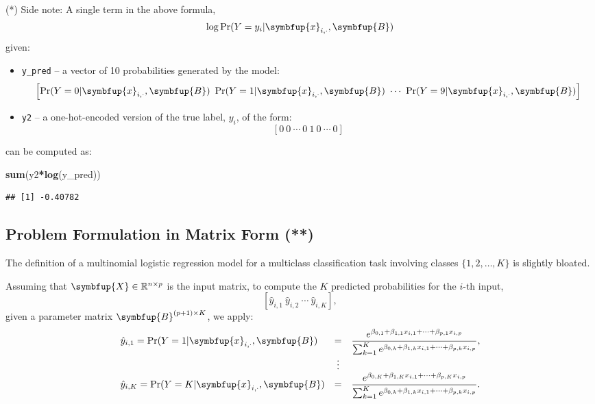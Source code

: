 \documentclass[10pt,b5paper,krantz1]{krantz}
\newenvironment{Shaded}{\begin{snugshade}}{\end{snugshade}}
\newcommand{\KeywordTok}[1]{\textcolor[rgb]{0.27,0.27,0.27}{\textbf{#1}}}
\newcommand{\NormalTok}[1]{#1}
\newcommand{\OperatorTok}[1]{\textcolor[rgb]{0.43,0.43,0.43}{\textbf{#1}}}
\providecommand{\tightlist}{%
  \setlength{\itemsep}{0pt}\setlength{\parskip}{0pt}}
\renewcommand{\mathbf}[1]{\symbfup{#1}}
\begin{document}
(*) Side note: A single term in the above formula,
\[
\log \Pr(Y=y_i|\mathbf{x}_{i,\cdot},\mathbf{B})
\]
given:

\begin{itemize}
\tightlist
\item
  \texttt{y\_pred} -- a vector of 10 probabilities
  generated by the model:
  \[
  \left[\Pr(Y=0|\mathbf{x}_{i,\cdot},\mathbf{B})\  \Pr(Y=1|\mathbf{x}_{i,\cdot},\mathbf{B})\ \cdots\ \Pr(Y=9|\mathbf{x}_{i,\cdot},\mathbf{B})\right]
  \]
\item
  \texttt{y2} -- a one-hot-encoded version of the true label, \(y_i\), of the form:
  \[
  \left[0\ 0\ \cdots\ 0\ 1\ 0\ \cdots\ 0\right]
  \]
\end{itemize}

can be computed as:

\begin{Shaded}
\begin{Highlighting}[]
\KeywordTok{sum}\NormalTok{(y2}\OperatorTok{*}\KeywordTok{log}\NormalTok{(y_pred))}
\end{Highlighting}
\end{Shaded}

\begin{verbatim}
## [1] -0.40782
\end{verbatim}

\hypertarget{problem-formulation-in-matrix-form}{%
\subsection{Problem Formulation in Matrix Form (**)}\label{problem-formulation-in-matrix-form}}

The definition of a multinomial logistic regression
model for a multiclass classification task involving
classes \(\{1,2,\dots,K\}\)
is slightly bloated.

Assuming that \(\mathbf{X}\in\mathbb{R}^{n\times p}\) is the input matrix,
to compute the \(K\) predicted probabilities for the \(i\)-th input,
\[
\left[
\hat{y}_{i,1}\ \hat{y}_{i,2}\ \cdots\ \hat{y}_{i,K}
\right],
\]
given a parameter matrix \(\mathbf{B}^{(p+1)\times K}\), we apply:
\[
\begin{array}{lcl}
\hat{y}_{i,1}=\Pr(Y=1|\mathbf{x}_{i,\cdot},\mathbf{B})&=&\displaystyle\frac{e^{\beta_{0,1} + \beta_{1,1} x_{i,1} +  \dots + \beta_{p,1} x_{i,p}}}{\sum_{k=1}^K e^{\beta_{0,k} + \beta_{1,k} x_{i,1} +  \dots + \beta_{p,k} x_{i,p}}},\\
&\vdots&\\
\hat{y}_{i,K}=\Pr(Y=K|\mathbf{x}_{i,\cdot},\mathbf{B})&=&\displaystyle\frac{e^{\beta_{0,K} + \beta_{1,K} x_{i,1} +  \dots + \beta_{p,K} x_{i,p}}}{\sum_{k=1}^K e^{\beta_{0,k} + \beta_{1,k} x_{i,1} +  \dots + \beta_{p,k} x_{i,p}}}.\\
\end{array}
\]
\end{document}

